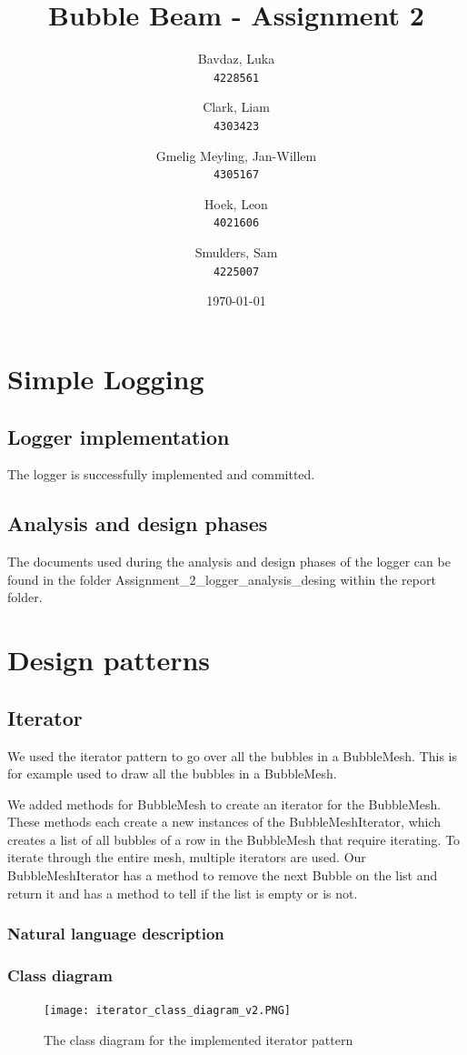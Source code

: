 \documentclass[a4paper]{article}
\title{Bubble Beam - Assignment 2}
\author{
    Bavdaz, Luka\\
    \texttt{4228561}
    \and
    Clark, Liam\\
    \texttt{4303423}
    \and
    Gmelig Meyling, Jan-Willem\\
    \texttt{4305167}
    \and
    Hoek, Leon\\
    \texttt{4021606}
    \and
    Smulders, Sam\\
    \texttt{4225007}
}
\date{\today}
\begin{document}
\maketitle

\section{Simple Logging}

\subsection{Logger implementation}
The logger is successfully implemented and committed.

\subsection{Analysis and design phases}
The documents used during the analysis and design phases of the logger can be found in the folder Assignment\_2\_logger\_analysis\_desing within the report folder.

\section{Design patterns}

\subsection{Iterator}
We used the iterator pattern to go over all the bubbles in a BubbleMesh. This is for example used to draw all the bubbles in a BubbleMesh.

We added methods for BubbleMesh to create an iterator for the BubbleMesh. These methods each create a new instances of the BubbleMeshIterator, which creates a list of all bubbles of a row in the BubbleMesh that require iterating. To iterate through the entire mesh, multiple iterators are used. Our BubbleMeshIterator has a method to remove the next Bubble on the list and return it and has a method to tell if the list is empty or is not.

\subsubsection{Natural language description}

\subsubsection{Class diagram}
\begin{figure}[H]
\centering
    \texttt{[image: iterator\_class\_diagram\_v2.PNG]}
    \caption{\label{fig:class_iterator} The class diagram for the implemented iterator pattern}
\end{figure}
\end{document}
